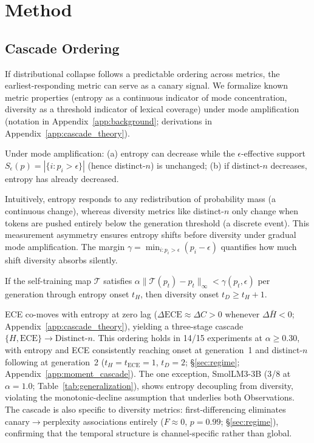 
\section{Method}
\label{sec:method}

\subsection{Cascade Ordering}
\label{sec:cascade}

If distributional collapse follows a predictable ordering across metrics, the earliest-responding metric can serve as a canary signal.
We formalize known metric properties (entropy as a continuous indicator of mode concentration, diversity as a threshold indicator of lexical coverage) under mode amplification~\citep{shumailov2024curse,dohmatob2024tale} (notation in Appendix~\ref{app:background}; derivations in Appendix~\ref{app:cascade_theory}).

\begin{observation}\label{thm:entropy_leads}
Under mode amplification: \textup{(a)} entropy can decrease while the $\epsilon$-effective support $S_\epsilon(p) {=} |\{i: p_i > \epsilon\}|$ (hence distinct-$n$) is unchanged; \textup{(b)} if distinct-$n$ decreases, entropy has already decreased.
\end{observation}

Intuitively, entropy responds to any redistribution of probability mass (a continuous change), whereas diversity metrics like distinct-$n$ only change when tokens are pushed entirely below the generation threshold (a discrete event).
This measurement asymmetry ensures entropy shifts before diversity under gradual mode amplification.
The margin $\gamma = \min_{i: p_i > \epsilon}(p_i - \epsilon)$ quantifies how much shift diversity absorbs silently.

\begin{observation}\label{prop:div_lag}
If the self-training map $\mathcal{T}$ satisfies $\alpha\|\mathcal{T}(p_t) - p_t\|_\infty < \gamma(p_t, \epsilon)$ per generation through entropy onset $t_H$, then diversity onset $t_D \geq t_H + 1$.
\end{observation}

ECE co-moves with entropy at zero lag ($\Delta\mathrm{ECE} \approx \Delta C > 0$ whenever $\Delta\bar{H} < 0$; Appendix~\ref{app:cascade_theory}), yielding a three-stage cascade $\{H, \mathrm{ECE}\} \to \mathrm{Distinct}$-$n$.
This ordering holds in 14/15 experiments at $\alpha \geq 0.30$, with entropy and ECE consistently reaching onset at generation~1 and distinct-$n$ following at generation~2 ($t_H{=}t_{\mathrm{ECE}}{=}1$, $t_D{=}2$; \S\ref{sec:regime}; Appendix~\ref{app:moment_cascade}).
The one exception, SmolLM3-3B (3/8 at $\alpha{=}1.0$; Table~\ref{tab:generalization}), shows entropy decoupling from diversity, violating the monotonic-decline assumption that underlies both Observations.
The cascade is also specific to diversity metrics: first-differencing eliminates canary$\to$perplexity associations entirely ($F{\approx}0$, $p{=}0.99$; \S\ref{sec:regime}), confirming that the temporal structure is channel-specific rather than global.

